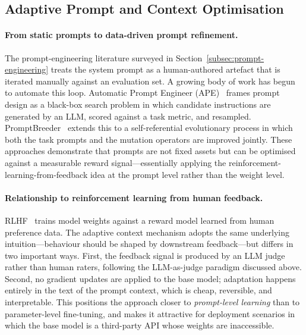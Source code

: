 \subsection{Adaptive Prompt and Context Optimisation}
\label{subsec:adaptive-context}

\paragraph{From static prompts to data-driven prompt refinement.}
The prompt-engineering literature surveyed in
Section~\ref{subsec:prompt-engineering} treats the system prompt as a
human-authored artefact that is iterated manually against an
evaluation set. A growing body of work has begun to automate this
loop. Automatic Prompt Engineer (APE)~\cite{zhou2023ape} frames prompt
design as a black-box search problem in which candidate instructions
are generated by an LLM, scored against a task metric, and resampled.
PromptBreeder~\cite{fernando2023promptbreeder} extends this to a
self-referential evolutionary process in which both the task prompts
and the mutation operators are improved jointly. These approaches
demonstrate that prompts are not fixed assets but can be optimised
against a measurable reward signal---essentially applying the
reinforcement-learning-from-feedback idea at the prompt level rather
than the weight level.

\paragraph{Relationship to reinforcement learning from human feedback.}
RLHF~\cite{ouyang2022instructgpt} trains model weights against a
reward model learned from human preference data. The adaptive context
mechanism adopts the same underlying intuition---behaviour should be
shaped by downstream feedback---but differs in two important ways.
First, the feedback signal is produced by an LLM judge rather than
human raters, following the LLM-as-judge paradigm discussed above.
Second, no gradient updates are applied to the base model; adaptation
happens entirely in the text of the prompt context, which is cheap,
reversible, and interpretable. This positions the approach closer to
\emph{prompt-level learning} than to parameter-level fine-tuning, and
makes it attractive for deployment scenarios in which the base model
is a third-party API whose weights are inaccessible.

